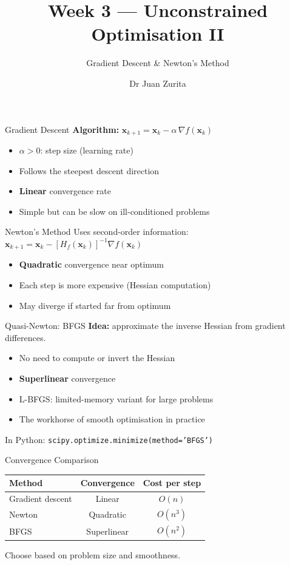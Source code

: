 \documentclass[aspectratio=169, 10pt]{beamer}
\title{Week 3 --- Unconstrained Optimisation II}
\subtitle{Gradient Descent \& Newton's Method}
\author{Dr Juan Zurita}
\institute{Optimisation \& Mathematical Methods for Economics\\
The University of Edinburgh~$\cdot$~School of Economics}
\date{}
\begin{document}
\maketitle

\begin{frame}{Gradient Descent}
\textbf{Algorithm:} $\mathbf{x}_{k+1} = \mathbf{x}_k - \alpha\,\nabla f(\mathbf{x}_k)$\\\bigskip\begin{itemize}\item $\alpha > 0$: step size (learning rate)\item Follows the steepest descent direction\item \textbf{Linear} convergence rate\item Simple but can be slow on ill-conditioned problems\end{itemize}
\end{frame}

\begin{frame}{Newton's Method}
Uses second-order information:\\ $\mathbf{x}_{k+1} = \mathbf{x}_k - [H_f(\mathbf{x}_k)]^{-1}\nabla f(\mathbf{x}_k)$\\\bigskip\begin{itemize}\item \textbf{Quadratic} convergence near optimum\item Each step is more expensive (Hessian computation)\item May diverge if started far from optimum\end{itemize}
\end{frame}

\begin{frame}{Quasi-Newton: BFGS}
\textbf{Idea:} approximate the inverse Hessian from gradient differences.\\\bigskip\begin{itemize}\item No need to compute or invert the Hessian\item \textbf{Superlinear} convergence\item L-BFGS: limited-memory variant for large problems\item The workhorse of smooth optimisation in practice\end{itemize}\par\bigskip In Python: \texttt{scipy.optimize.minimize(method='BFGS')}
\end{frame}

\begin{frame}{Convergence Comparison}
\begin{center}\begin{tabular}{lcc}\toprule Method & Convergence & Cost per step \\ \midrule Gradient descent & Linear & $O(n)$ \\ Newton & Quadratic & $O(n^3)$ \\ BFGS & Superlinear & $O(n^2)$ \\ \bottomrule\end{tabular}\end{center}\par\bigskip Choose based on problem size and smoothness.
\end{frame}
\end{document}
